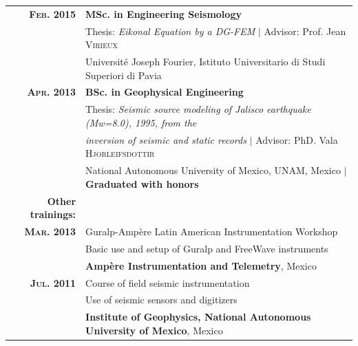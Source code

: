 \documentclass[a4paper,10pt]{article} %
\begin{document}
\begin{tabular}{rl}	
{\bf \textsc{Feb.} 2015} & {\bf MSc. in Engineering Seismology} \\
& Thesis: \emph{Eikonal Equation by a DG-FEM} $|$ \small Advisor: Prof. Jean \textsc{Virieux}\\
& \small{Universit\'e Joseph Fourier, Istituto Universitario di Studi Superiori di Pavia}\\[0.4em]

{\bf \textsc{Apr.} 2013} & {\bf BSc. in Geophysical Engineering} \\
& Thesis: \emph{Seismic source modeling of Jalisco earthquake (Mw=8.0), 1995, from the} \\
& \emph{inversion of seismic and static records} $|$ \small Advisor: PhD. Vala \textsc{Hjorleifsdottir}\\
& \small{National Autonomous University of Mexico, UNAM, Mexico} $|$ \bf{Graduated with honors} \\[0.4em]

{\bf Other trainings:}\\[0.4em]
{\bf \textsc{Mar.} 2013} & Guralp-Amp\`ere Latin American Instrumentation Workshop\\
& Basic use and setup of Guralp and FreeWave instruments\\
& \small\textbf{Amp\`ere Instrumentation and Telemetry}, Mexico\\[0.4em]

{\bf \textsc{Jul.} 2011} & Course of field seismic instrumentation\\
& Use of seismic sensors and digitizers\\
& \small\textbf{Institute of Geophysics, National Autonomous University of Mexico}, Mexico\\
\end{tabular}
\end{document}

